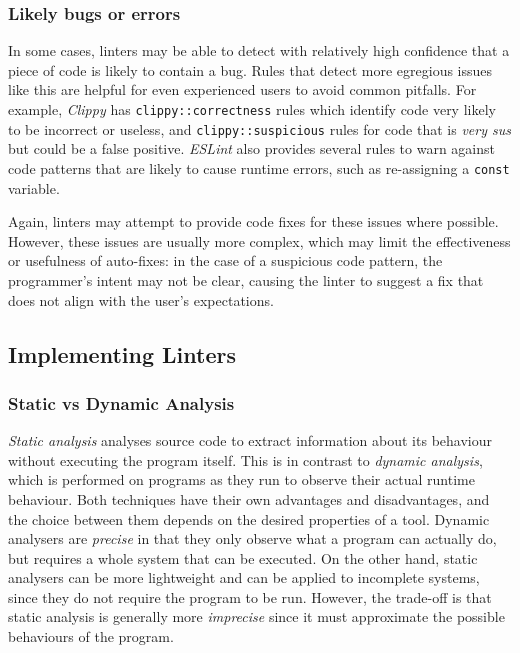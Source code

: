 \documentclass[../../main.tex]{subfiles}
\begin{document}
\subsubsection{Likely bugs or errors}
In some cases, linters may be able to detect with relatively high confidence that a piece of code is likely to contain a bug.
Rules that detect more egregious issues like this are helpful for even experienced users to avoid common pitfalls.
For example, \emph{Clippy} has \texttt{clippy::correctness} rules which identify code very likely to be incorrect or useless, and \texttt{clippy::suspicious} rules for code that is \emph{very sus} but could be a false positive.
\emph{ESLint} also provides several rules to warn against code patterns that are likely to cause runtime errors, such as re-assigning a \texttt{const} variable.

Again, linters may attempt to provide code fixes for these issues where possible.
However, these issues are usually more complex, which may limit the effectiveness or usefulness of auto-fixes: in the case of a suspicious code pattern, the programmer's intent may not be clear, causing the linter to suggest a fix that does not align with the user's expectations.

\subsection{Implementing Linters}
\subsubsection{Static vs Dynamic Analysis}
\emph{Static analysis} analyses source code to extract information about its behaviour without executing the program itself.
This is in contrast to \emph{dynamic analysis}, which is performed on programs as they run to observe their actual runtime behaviour.
Both techniques have their own advantages and disadvantages, and the choice between them depends on the desired properties of a tool.
Dynamic analysers are \emph{precise} in that they only observe what a program can actually do, but requires a whole system that can be executed.
On the other hand, static analysers can be more lightweight and can be applied to incomplete systems, since they do not require the program to be run.
However, the trade-off is that static analysis is generally more \emph{imprecise} since it must approximate the possible behaviours of the program.
\end{document}
